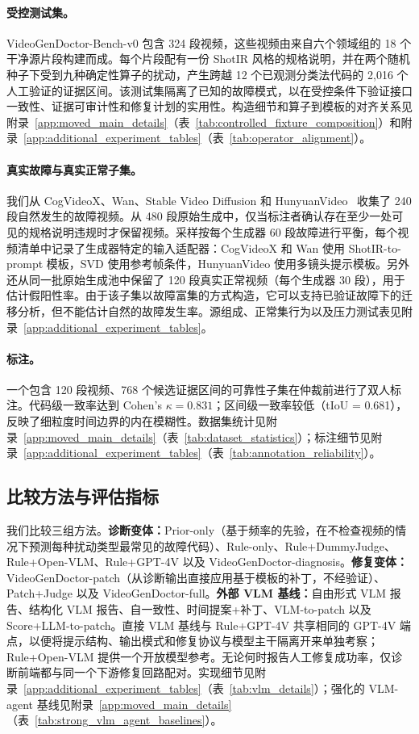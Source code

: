 \documentclass{article}
\newcommand{\IAAcode}{0.831}
\newcommand{\IAAspan}{0.681}
\begin{document}
\paragraph{受控测试集。}
VideoGenDoctor-Bench-v0 包含 324 段视频，这些视频由来自六个领域组的 18 个干净源片段构建而成。每个片段配有一份 ShotIR 风格的规格说明，并在两个随机种子下受到九种确定性算子的扰动，产生跨越 12 个已观测分类法代码的 2,016 个人工验证的证据区间。该测试集隔离了已知的故障模式，以在受控条件下验证接口一致性、证据可审计性和修复计划的实用性。构造细节和算子到模板的对齐关系见附录~\ref{app:moved_main_details}（表~\ref{tab:controlled_fixture_composition}）和附录~\ref{app:additional_experiment_tables}（表~\ref{tab:operator_alignment}）。

\paragraph{真实故障与真实正常子集。}
我们从 CogVideoX、Wan、Stable Video Diffusion 和 HunyuanVideo~\cite{cogvideox2024,wan2025,svd2023,hunyuanvideo2025} 收集了 240 段自然发生的故障视频。从 480 段原始生成中，仅当标注者确认存在至少一处可见的规格说明违规时才保留视频。采样按每个生成器 60 段故障进行平衡，每个视频清单中记录了生成器特定的输入适配器：CogVideoX 和 Wan 使用 ShotIR-to-prompt 模板，SVD 使用参考帧条件，HunyuanVideo 使用多镜头提示模板。另外还从同一批原始生成池中保留了 120 段真实正常视频（每个生成器 30 段），用于估计假阳性率。由于该子集以故障富集的方式构造，它可以支持已验证故障下的迁移分析，但不能估计自然的故障发生率。源组成、正常集行为以及压力测试表见附录~\ref{app:additional_experiment_tables}。

\paragraph{标注。}
一个包含 120 段视频、768 个候选证据区间的可靠性子集在仲裁前进行了双人标注。代码级一致率达到 Cohen's $\kappa = \IAAcode$；区间级一致率较低（tIoU = \IAAspan），反映了细粒度时间边界的内在模糊性。数据集统计见附录~\ref{app:moved_main_details}（表~\ref{tab:dataset_statistics}）；标注细节见附录~\ref{app:additional_experiment_tables}（表~\ref{tab:annotation_reliability}）。

\subsection{比较方法与评估指标}
我们比较三组方法。\textbf{诊断变体：}Prior-only（基于频率的先验，在不检查视频的情况下预测每种扰动类型最常见的故障代码）、Rule-only、Rule+DummyJudge、Rule+Open-VLM、Rule+GPT-4V 以及 VideoGenDoctor-diagnosis。\textbf{修复变体：}VideoGenDoctor-patch（从诊断输出直接应用基于模板的补丁，不经验证）、Patch+Judge 以及 VideoGenDoctor-full。\textbf{外部 VLM 基线：}自由形式 VLM 报告、结构化 VLM 报告、自一致性、时间提案+补丁、VLM-to-patch 以及 Score+LLM-to-patch。直接 VLM 基线与 Rule+GPT-4V 共享相同的 GPT-4V 端点，以便将提示结构、输出模式和修复协议与模型主干隔离开来单独考察；Rule+Open-VLM 提供一个开放模型参考。无论何时报告人工修复成功率，仅诊断前端都与同一个下游修复回路配对。实现细节见附录~\ref{app:additional_experiment_tables}（表~\ref{tab:vlm_details}）；强化的 VLM-agent 基线见附录~\ref{app:moved_main_details}（表~\ref{tab:strong_vlm_agent_baselines}）。
\end{document}
